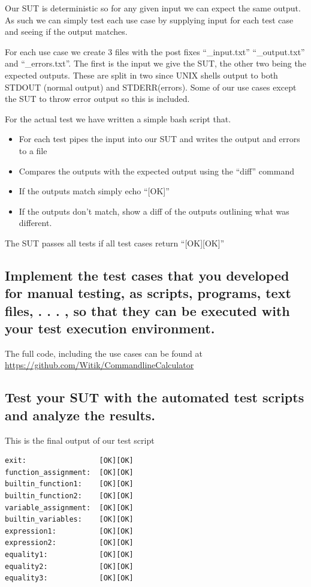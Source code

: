 \documentclass[11pt,a4paper]{article}
\begin{document}
Our SUT is deterministic so for any given input we can expect the
same output. As such we can simply test each use case by supplying
input for each test case and seeing if the output matches.

For each use case we create 3 files with the post fixes
``\_{}input.txt'' ``\_{}output.txt'' and ``\_{}errors.txt''. The first
is the input we give the SUT, the other two being the expected
outputs. These are split in two since UNIX shells output to both
STDOUT (normal output) and STDERR(errors). Some of our use cases
except the SUT to throw error output so this is included.

For the actual test we have written a simple bash script that.

\begin{itemize}
\item For each test pipes the input into our SUT and writes the output and errors to a file
\item Compares the outputs with the expected output using the ``diff'' command
\item If the outputs match simply echo ``[OK]''
\item If the outputs don't match, show a diff of the outputs outlining what was different.
\end{itemize}

The SUT passes all tests if all test cases return ``[OK][OK]''

\subsection{Implement the test cases that you developed for manual testing, as scripts, programs, text files, . . . , so that they can be executed with your test execution environment.}

The full code, including the use cases can be found at \url{https://github.com/Witik/CommandlineCalculator}

\subsection{Test your SUT with the automated test scripts and analyze the results.}

This is the final output of our test script

\begin{verbatim}
exit:                 [OK][OK]
function_assignment:  [OK][OK]
builtin_function1:    [OK][OK]
builtin_function2:    [OK][OK]
variable_assignment:  [OK][OK]
builtin_variables:    [OK][OK]
expression1:          [OK][OK]
expression2:          [OK][OK]
equality1:            [OK][OK]
equality2:            [OK][OK]
equality3:            [OK][OK]
\end{verbatim}
\end{document}
